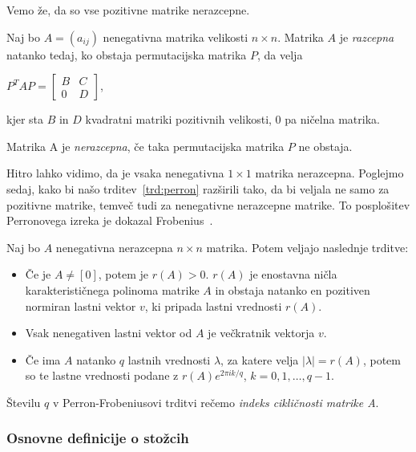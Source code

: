 \documentclass[mat2, tisk]{fmfdelo}
\begin{document}
Vemo že, da so vse pozitivne matrike nerazcepne. 

\begin{definicija}
  Naj bo $A = (a_{ij})$ nenegativna matrika velikosti $n \times n$. Matrika 
  $A$ je \emph{razcepna} natanko tedaj, ko obstaja permutacijska matrika $P$, da 
  velja 
  \begin{center}
    $P^T A P = 
    \begin{bmatrix}
      B & C \\
      0 & D
    \end{bmatrix}$,
  \end{center}

  kjer sta $B$ in $D$ kvadratni matriki pozitivnih velikosti,
  $0$ pa ničelna matrika.

  Matrika A je \emph{nerazcepna}, če taka permutacijska matrika $P$ ne 
  obstaja.
\end{definicija}

Hitro lahko vidimo, da je vsaka nenegativna $1 \times 1$ matrika nerazcepna.
Poglejmo sedaj, kako bi našo trditev~\ref{trd:perron} razširili tako, da bi veljala 
ne samo za pozitivne matrike, temveč tudi za nenegativne nerazcepne matrike. To posplošitev 
Perronovega izreka je dokazal Frobenius~\cite{Shur2016}. 

\begin{trditev}\label{trd:per-fro}
  Naj bo $A$ nenegativna nerazcepna $n \times n$ matrika. Potem veljajo naslednje trditve:
  \begin{itemize}
    \item Če je $A \neq [0]$, potem je $r(A) > 0$.
          $r(A)$ je enostavna ničla karakterističnega polinoma matrike $A$ in 
          obstaja natanko en pozitiven normiran lastni vektor $v$, ki pripada
          lastni vrednosti $r(A)$.
    \item Vsak nenegativen lastni vektor od $A$ je večkratnik vektorja $v$.
    \item Če ima $A$ natanko $q$ lastnih vrednosti $\lambda$, za katere
          velja $| \lambda | = r(A)$, potem so te lastne vrednosti 
          podane z $r(A) e^{2\pi i k / q}$, $k = 0, 1, \ldots, q-1$.
  \end{itemize}
\end{trditev}

Številu $q$ v Perron-Frobeniusovi trditvi rečemo \emph{indeks cikličnosti matrike A}.

\subsubsection{Osnovne definicije o stožcih}
\end{document}
